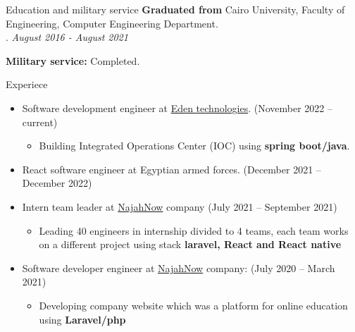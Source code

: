 \documentclass{resume}
\begin{document}

\begin{rSection}{Education and military service}
  \textbf{Graduated from} Cairo University, Faculty of Engineering, Computer Engineering Department.\\ . \hfill {\em August 2016 - August 2021}

  \textbf{Military service:} Completed.

\end{rSection}


\begin{rSection}{Experiece}
  \begin{itemize}
    \item Software development engineer at \href{https://www.linkedin.com/company/edentech2/mycompany/}{Eden technologies}. \hfill{(November 2022 – current)}
          \begin{itemize}
            \item Building Integrated Operations Center (IOC) using \textbf{spring boot/java}.
          \end{itemize}
    \item React software engineer at Egyptian armed forces. \hfill{(December 2021 – December 2022)}
    \item Intern team leader at \href{https://najahnow.net}{NajahNow} company \hfill{(July 2021 – September 2021)}
          \begin{itemize}
            \item Leading 40 engineers in internship divided to 4 teams, 
            each team works on a different project using stack \textbf{laravel, React and React native}
          \end{itemize}

    \item Software developer engineer at \href{https://najahnow.net}{NajahNow} company: \hfill{(July 2020 – March 2021)}
          \begin{itemize}
            \item Developing company website which was a platform for online education using \textbf{Laravel/php}
          \end{itemize}
  \end{itemize}
\end{rSection}
\end{document}
